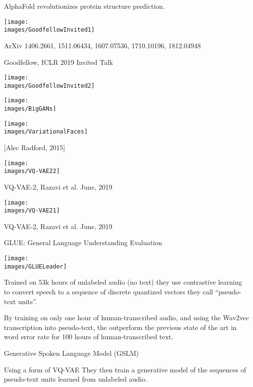{{\vfill
AlphaFold revolutionizes protein structure prediction.

\centerline{\texttt{[image: \\images/GoodfellowInvited1]}}

ArXiv 1406.2661, 1511.06434, 1607.07536, 1710.10196, 1812.04948

\centerline{Goodfellow, ICLR 2019 Invited Talk}


\centerline{\texttt{[image: \\images/GoodfellowInvited2]}}


\centerline{\texttt{[image: \\images/BigGANs]}}


\centerline{\texttt{[image: \\images/VariationalFaces]}}
\centerline{[Alec Radford, 2015]}


\centerline{\texttt{[image: \\images/VQ-VAE22]}}

\vfill
VQ-VAE-2, Razavi et al. June, 2019


\centerline{\texttt{[image: \\images/VQ-VAE21]}}

\vfill
VQ-VAE-2, Razavi et al. June, 2019


GLUE: General Language Understanding Evaluation

\centerline{\texttt{[image: \\images/GLUELeader]}}


\vfill
Trained on 53k hours of unlabeled audio (no text) they use {\color{red} contrastive learning} to convert speech to a sequence of discrete {\color{red} quantized vectors} they call ``pseudo-text units''.

\vfill
By training on only one hour of human-transcribed audio, and using the Wav2vec transcription into pseudo-text, the outperform the previous state of the
art in word error rate for 100 hours of human-transcribed text.



Generative Spoken Language Model (GSLM)

\vfill
Using a form of {\color{red} VQ-VAE} They then train a generative model of the sequences of pseudo-text units learned from unlabeled audio.


}}

